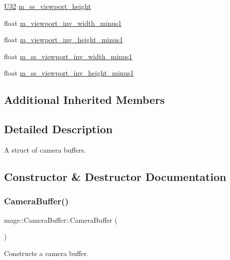 \begin{DoxyCompactItemize}
\hyperlink{namespacemage_a41c104c036fba3756a74e19f793eeaa1}{U32} \hyperlink{structmage_1_1_camera_buffer_a6bbc5a57e9f456518afacf0a0e5633ed}{m\+\_\+ss\+\_\+viewport\+\_\+height}
\item 
float \hyperlink{structmage_1_1_camera_buffer_a732177939aabe34b07d2120275fb246a}{m\+\_\+viewport\+\_\+inv\+\_\+width\+\_\+minus1}
\item 
float \hyperlink{structmage_1_1_camera_buffer_ad347cafbbd512bda9324033d08315846}{m\+\_\+viewport\+\_\+inv\+\_\+height\+\_\+minus1}
\item 
float \hyperlink{structmage_1_1_camera_buffer_a4e400cc708de607778c71aec784b30ce}{m\+\_\+ss\+\_\+viewport\+\_\+inv\+\_\+width\+\_\+minus1}
\item 
float \hyperlink{structmage_1_1_camera_buffer_a6aa695ae5bfa64139e104df95a6f844e}{m\+\_\+ss\+\_\+viewport\+\_\+inv\+\_\+height\+\_\+minus1}
\end{DoxyCompactItemize}
\subsection*{Additional Inherited Members}


\subsection{Detailed Description}
A struct of camera buffers. 

\subsection{Constructor \& Destructor Documentation}
\hypertarget{structmage_1_1_camera_buffer_aca0a689a43c84fdc02e72d792b1a0ab3}{}\label{structmage_1_1_camera_buffer_aca0a689a43c84fdc02e72d792b1a0ab3} 
\subsubsection{\texorpdfstring{Camera\+Buffer()}{CameraBuffer()}\hspace{0.1cm}{\footnotesize\ttfamily [1/3]}}
{\footnotesize\ttfamily mage\+::\+Camera\+Buffer\+::\+Camera\+Buffer (\begin{DoxyParamCaption}{ }\end{DoxyParamCaption})}

Constructs a camera buffer. \hypertarget{structmage_1_1_camera_buffer_a4677e0eeb321f52a6f0160c7265186a3}{}\label{structmage_1_1_camera_buffer_a4677e0eeb321f52a6f0160c7265186a3} 
